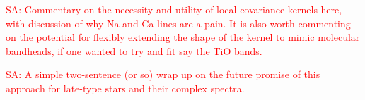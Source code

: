 \documentclass[iop,floatfix]{emulateapj}
\newcommand{\comm}[1]{ \textcolor{red}{SA: #1}}
\begin{document}
\comm{Commentary on the necessity and utility of local covariance kernels here, with discussion of why Na and Ca 
lines are a pain.  It is also worth commenting on the potential for flexibly extending the shape of 
the kernel to mimic molecular bandheads, if one wanted to try and fit say the TiO bands.}

\comm{A simple two-sentence (or so) wrap up on the future promise of this approach for late-type 
stars and their complex spectra.}
\end{document}
